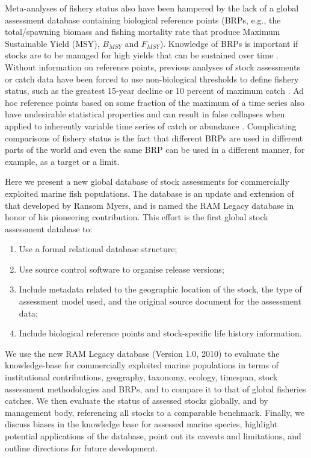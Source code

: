 \documentclass[letterpaper,review,authoryear,12pt]{elsarticle}
\begin{document}
Meta-analyses of fishery status also have been hampered by the
lack of a global assessment database containing biological reference
points (BRPs, e.g., the total/spawning biomass and fishing mortality rate that
produce Maximum Sustainable Yield (MSY), $B_{MSY}$ and $F_{MSY}$).  Knowledge of BRPs
is important if stocks are to be managed for high yields that can be
sustained over time \citep{Mace:1994:cjfas}.  Without information on
reference points, previous analyses of stock assessments or catch data
have been forced to use non-biological thresholds to define fishery
status, such as the greatest 15-year decline
\citep{Hutchings:Reynolds:2004:biosci} or 10 percent of maximum catch
\citep{Worm:etal:2006:science}. Ad hoc reference points based on some
fraction of the maximum of a time series also have undesirable
statistical properties and can result in false collapses when applied
to inherently variable time series of catch or abundance
\citep{Wilberg:Miller:2007:science, branch:2008:marpol}.  Complicating
comparisons of fishery status is the fact that different BRPs are used
in different parts of the world and even the same BRP can be used in a
different manner, for example, as a target or a limit. 

Here we present a new global database of stock assessments for
commercially exploited marine fish populations.  The database is an
update and extension of that developed by Ransom Myers, and is named
the RAM Legacy database in honor of his pioneering contribution.  This
effort is the first global stock assessment database to:
\begin{enumerate}
\item Use a formal relational database structure;
\item Use source control software to organise release versions;
\item Include metadata related to the geographic location of the stock, the type of assessment model used, and the original source document for the assessment data;
\item Include biological reference points and stock-specific life history information. 
\end{enumerate}


We use the new RAM Legacy database (Version 1.0, 2010) to evaluate the
knowledge-base for commercially exploited marine populations in terms
of institutional contributions, geography, taxonomy, ecology,
timespan, stock assessment methodologies and BRPs, and to compare it
to that of global fisheries catches. We then evaluate the status of
assessed stocks globally, and by management body, referencing all
stocks to a comparable benchmark. Finally, we discuss biases in the
knowledge base for assessed marine species, highlight potential
applications of the database, point out its caveats and limitations,
and outline directions for future development.
\end{document}
